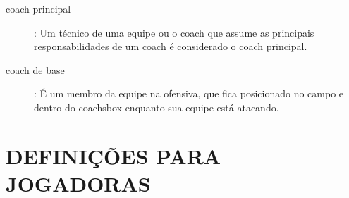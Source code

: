 \begin{description}	
	\item[\Gls{coach} principal]:  	Um t\'ecnico de uma equipe ou o \gls{coach} que assume as principais responsabilidades de um \gls{coach} \'e considerado o \gls{coach} principal. 
	\item[\Gls{coach} de base]: \'E um membro da equipe na ofensiva, que fica posicionado no campo e dentro do \gls{coachsbox} enquanto sua equipe est\'a atacando. 

\end{description}

\section{DEFINI\c{C}\~OES PARA JOGADORAS} 

